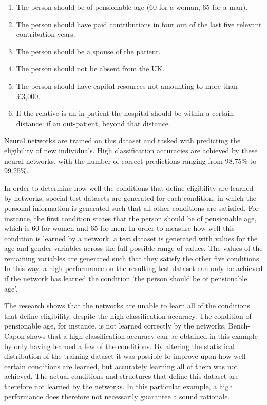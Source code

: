 \documentclass[letterpaper]{article} %
\begin{document}
\begin{enumerate}
\item
The person should be of pensionable age (60 for a woman, 65 for a man).
\item
The person should have paid contributions in four out of the last five relevant contribution years. 
\item
The person should be a spouse of the patient.
\item
The person should not be absent from the UK.
\item
The person should have capital resources not amounting to more than \pounds 3,000.
\item 
If the relative is an in-patient the hospital should be within a certain distance: if an out-patient, beyond that distance.
\end{enumerate}

\noindent Neural networks are trained on this dataset and tasked with predicting the eligibility of new individuals. High classification accuracies are achieved by these neural networks, with the number of correct predictions ranging from 98.75\% to 99.25\%. 

In order to determine how well the conditions that define eligibility are learned by networks, special test datasets are generated for each condition, in which the personal information is generated such that all other conditions are satisfied. For instance, the first condition states that the person should be of pensionable age, which is 60 for women and 65 for men. In order to measure how well this condition is learned by a network, a test dataset is generated with values for the age and gender variables across the full possible range of values. The values of the remaining variables are generated such that they satisfy the other five conditions. In this way, a high performance on the resulting test dataset can only be achieved if the network has learned the condition 'the person should be of pensionable age'.

The research shows that the networks are unable to learn all of the conditions that define eligibility, despite the high classification accuracy. The condition of pensionable age, for instance, is not learned correctly by the networks. Bench-Capon shows that a high classification accuracy can be obtained in this example by only having learned a few of the conditions. By altering the statistical distribution of the training dataset it was possible to improve upon how well certain conditions are learned, but accurately learning all of them was not achieved. The actual conditions and structures that define this dataset are therefore not learned by the networks. In this particular example, a high performance does therefore not necessarily guarantee a sound rationale.
\end{document}
